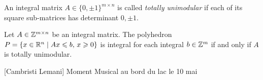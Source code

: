 





\begin{definition}
  \label{def:skip1}  
  An integral matrix $A \in \{0 , \pm 1\}^{m\times n}$ is
  called \emph{totally
  unimodular} if each of its square sub-matrices has
  determinant
  $0,\pm1$.
\end{definition}
   

\begin{theorem}
  \label{po:thr:16}
  Let $A\in \mathbb{Z}^{m\times n}$ be an integral matrix. The polyhedron $P = \{ x
  \in \mathbb{R}^n \mid Ax\leqslant b, \, x\geqslant0\}$ is integral for each integral $b \in
  \mathbb{Z}^m$ if and only if $A$ is totally unimodular. 
\end{theorem}[Cambristi Lemani] Moment Musical au bord du lac le 10 mai


